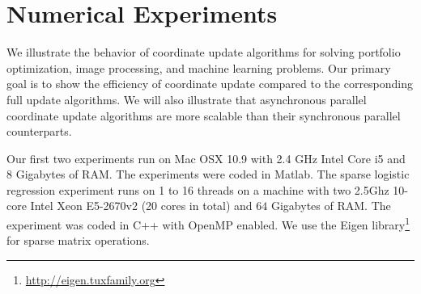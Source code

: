 \section{Numerical Experiments}\label{sec:numerical}
We illustrate the behavior of coordinate update algorithms for solving portfolio optimization, image processing, and machine learning problems. Our primary goal is to show the efficiency of coordinate update compared to the corresponding full update algorithms. We will also illustrate that asynchronous parallel coordinate update algorithms are more scalable than their synchronous parallel counterparts. 

Our first two experiments run on Mac OSX 10.9 with 2.4 GHz Intel Core i5 and 8 Gigabytes of RAM. The experiments were coded in Matlab. The sparse logistic regression experiment runs on 1 to 16 threads on a machine with two 2.5Ghz 10-core Intel Xeon E5-2670v2 (20 cores in total) and $64$ Gigabytes of RAM. The experiment was coded in C++ with OpenMP enabled. We use the Eigen library\footnote{\url{http://eigen.tuxfamily.org}} for sparse matrix operations.

